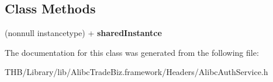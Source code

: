 \subsection*{Class Methods}
\begin{DoxyCompactItemize}
\item 
\mbox{\label{interface_alibc_auth_service_a75dc992c212f827bd51ac5db1e7766fd}} 
(nonnull instancetype) + {\bfseries shared\+Instantce}
\end{DoxyCompactItemize}


The documentation for this class was generated from the following file\+:\begin{DoxyCompactItemize}
\item 
T\+H\+B/\+Library/lib/\+Alibc\+Trade\+Biz.\+framework/\+Headers/Alibc\+Auth\+Service.\+h\end{DoxyCompactItemize}
